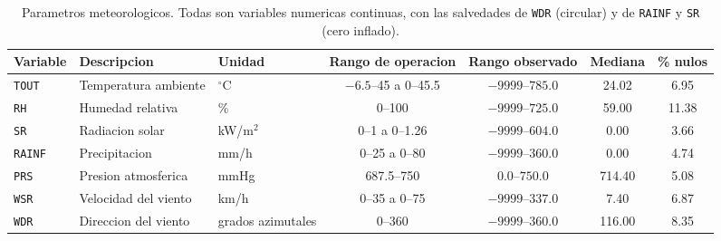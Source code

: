 \begin{table}[t]
  \centering
  \caption{Parametros meteorologicos. Todas son variables numericas continuas,
    con las salvedades de \texttt{WDR} (circular) y de \texttt{RAINF} y
    \texttt{SR} (cero inflado).}
  \label{tab:dic-meteo}
  \small
  \begin{tabular}{lllcccc}
    \toprule
    Variable & Descripcion & Unidad & Rango de operacion & Rango observado & Mediana & \% nulos \\
    \midrule
    \texttt{TOUT}  & Temperatura ambiente & $^{\circ}$C        & $-6.5$--45 a 0--45.5 & $-9999$--$785.0$ & 24.02  & 6.95  \\
    \texttt{RH}    & Humedad relativa     & \%                 & 0--100               & $-9999$--$725.0$ & 59.00  & 11.38 \\
    \texttt{SR}    & Radiacion solar      & kW/m$^2$           & 0--1 a 0--1.26       & $-9999$--$604.0$ & 0.00   & 3.66  \\
    \texttt{RAINF} & Precipitacion        & mm/h               & 0--25 a 0--80        & $-9999$--$360.0$ & 0.00   & 4.74  \\
    \texttt{PRS}   & Presion atmosferica  & mmHg               & 687.5--750           & $0.0$--$750.0$   & 714.40 & 5.08  \\
    \texttt{WSR}   & Velocidad del viento & km/h               & 0--35 a 0--75        & $-9999$--$337.0$ & 7.40   & 6.87  \\
    \texttt{WDR}   & Direccion del viento & grados azimutales  & 0--360               & $-9999$--$360.0$ & 116.00 & 8.35  \\
    \bottomrule
  \end{tabular}
\end{table}

